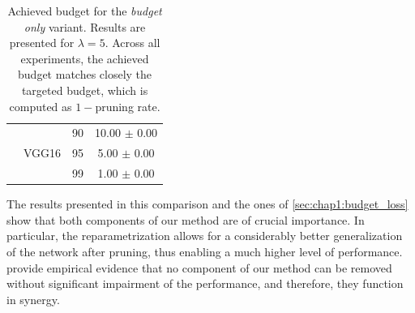 \begin{table}
\begin{tabular}{lllc}
                              & \multirow{3}{*}{VGG16}    & 90                         & 10.00 $\pm$ 0.00 \\
                              &                           & 95                         & 5.00 $\pm$ 0.00  \\
                              &                           & 99                         & 1.00 $\pm$ 0.00  \\
    \bottomrule
  \end{tabular}
  \caption{Achieved budget for the \emph{budget only} variant. Results are
    presented for $\lambda=5$. Across all experiments, the achieved budget matches
    closely the targeted budget, which is computed as $1-$pruning
    rate.}
  \label{tab:chap1:impact_of_reparametrisation}
\end{table}



The results presented in this comparison and the ones of
\cref{sec:chap1:budget_loss} show that both components of our method are of
crucial importance. In particular, the reparametrization allows for a
considerably better generalization of the network after pruning, thus enabling a
much higher level of performance.
provide empirical evidence that no component of our method can be removed
without significant impairment of the performance, and therefore, they function
in synergy.


